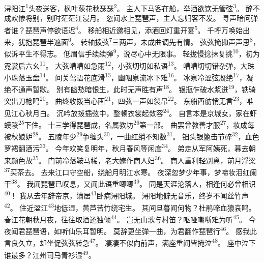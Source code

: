 
\begin{poem}
浔阳江\textsuperscript{1}头夜送客，枫叶荻花秋瑟瑟\textsuperscript{2}。
主人下马客在船，举酒欲饮无管弦\textsuperscript{3}。
醉不成欢惨将别，别时茫茫江浸月。
忽闻水上琵琶声，主人忘归客不发。
寻声暗问弹者谁？琵琶声停欲语迟\textsuperscript{4}。
移船相近邀相见，添酒回灯重开宴\textsuperscript{5}。
千呼万唤始出来，犹抱琵琶半遮面\textsuperscript{6}。
转轴拨弦\textsuperscript{7}三两声，未成曲调先有情。
弦弦掩抑声声思\textsuperscript{8}，似诉平生不得志。
低眉信手续续弹\textsuperscript{9}，说尽心中无限事。
轻拢慢捻抹复挑\textsuperscript{10}，初为霓裳后六幺\textsuperscript{11}。
大弦嘈嘈如急雨\textsuperscript{12}，小弦切切如私语\textsuperscript{13}。
嘈嘈切切错杂弹，大珠小珠落玉盘\textsuperscript{14}。
间关莺语花底滑\textsuperscript{15}，幽咽泉流冰下难\textsuperscript{16}。
冰泉冷涩弦凝绝\textsuperscript{17}，凝绝不通声暂歇。
别有幽愁暗恨生，此时无声胜有声\textsuperscript{18}。
银瓶乍破水浆迸\textsuperscript{19}，铁骑突出刀枪鸣\textsuperscript{20}。
曲终收拨当心画\textsuperscript{21}，四弦一声如裂帛\textsuperscript{22}。
东船西舫悄无言\textsuperscript{23}，唯见江心秋月白。
沉吟放拨插弦中，整顿衣裳起敛容\textsuperscript{24}。
自言本是京城女，家在虾蟆陵\textsuperscript{25}下住。
十三学得琵琶成，名属教坊\textsuperscript{26}第一部。
曲罢曾教善才服\textsuperscript{27}，妆成每被秋娘妒\textsuperscript{28}。
五陵年少\textsuperscript{29}争缠头\textsuperscript{30}，一曲红绡不知数\textsuperscript{31}。
钿头银篦击节碎\textsuperscript{32}，血色罗裙翻酒污\textsuperscript{33}。
今年欢笑复明年，秋月春风等闲度\textsuperscript{34}。
弟走从军阿姨死，暮去朝来颜色故\textsuperscript{35}。
门前冷落鞍马稀，老大嫁作商人妇\textsuperscript{36}。
商人重利轻别离，前月浮梁\textsuperscript{37}买茶去。
去来江口守空船，绕船月明江水寒。
夜深忽梦少年事，梦啼妆泪红阑干\textsuperscript{38}。
我闻琵琶已叹息，又闻此语重唧唧\textsuperscript{39}。
同是天涯沦落人，相逢何必曾相识\textsuperscript{40}！
我从去年辞帝京，谪居\textsuperscript{41}卧病浔阳城。
浔阳地僻无音乐，终岁不闻丝竹声\textsuperscript{42}。
住近湓江\textsuperscript{43}地低湿，黄芦苦竹绕宅生。
其间旦暮闻何物？杜鹃啼血猿哀鸣。
春江花朝秋月夜，往往取酒还独倾\textsuperscript{44}。
岂无山歌与村笛？呕哑嘲哳难为听\textsuperscript{45}。
今夜闻君琵琶语，如听仙乐耳暂明。
莫辞更坐弹一曲，为君翻作琵琶行\textsuperscript{46}。
感我此言良久立，却坐促弦弦转急\textsuperscript{47}。
凄凄不似向前声，满座重闻皆掩泣\textsuperscript{48}。
座中泣下谁最多？江州司马青衫湿\textsuperscript{49}。
\end{poem}


